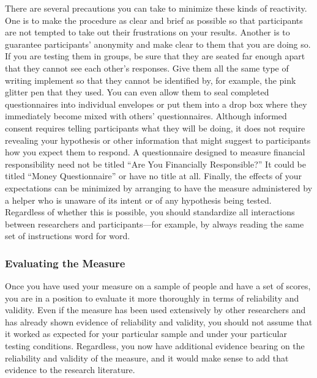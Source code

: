 \documentclass[
]{krantz}
\begin{document}
There are several precautions you can take to minimize these kinds of reactivity. One is to make the procedure as clear and brief as possible so that participants are not tempted to take out their frustrations on your results. Another is to guarantee participants' anonymity and make clear to them that you are doing so. If you are testing them in groups, be sure that they are seated far enough apart that they cannot see each other's responses. Give them all the same type of writing implement so that they cannot be identified by, for example, the pink glitter pen that they used. You can even allow them to seal completed questionnaires into individual envelopes or put them into a drop box where they immediately become mixed with others' questionnaires. Although informed consent requires telling participants what they will be doing, it does not require revealing your hypothesis or other information that might suggest to participants how you expect them to respond. A questionnaire designed to measure financial responsibility need not be titled ``Are You Financially Responsible?'' It could be titled ``Money Questionnaire'' or have no title at all. Finally, the effects of your expectations can be minimized by arranging to have the measure administered by a helper who is unaware of its intent or of any hypothesis being tested. Regardless of whether this is possible, you should standardize all interactions between researchers and participants---for example, by always reading the same set of instructions word for word.

\hypertarget{evaluating-the-measure}{%
\subsubsection*{Evaluating the Measure}\label{evaluating-the-measure}}


Once you have used your measure on a sample of people and have a set of scores, you are in a position to evaluate it more thoroughly in terms of reliability and validity. Even if the measure has been used extensively by other researchers and has already shown evidence of reliability and validity, you should not assume that it worked as expected for your particular sample and under your particular testing conditions. Regardless, you now have additional evidence bearing on the reliability and validity of the measure, and it would make sense to add that evidence to the research literature.
\end{document}
